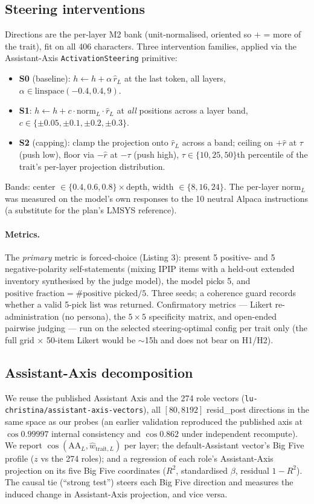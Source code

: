 \documentclass[11pt]{article}
\begin{document}
\subsection{Steering interventions}
Directions are the per-layer M2 bank (unit-normalised, oriented so $+$ = more of
the trait), fit on all 406 characters. Three intervention families, applied via
the Assistant-Axis \texttt{ActivationSteering} primitive:
\begin{itemize}
  \item \textbf{S0} (baseline): $h\!\leftarrow\!h+\alpha\,\hat r_L$ at the last
        token, all layers, $\alpha\in\text{linspace}(-0.4,0.4,9)$.
  \item \textbf{S1}: $h\!\leftarrow\!h+c\cdot\text{norm}_L\cdot\hat r_L$ at
        \emph{all} positions across a layer band, $c\in\{\pm0.05,\pm0.1,\pm0.2,\pm0.3\}$.
  \item \textbf{S2} (capping): clamp the projection onto $\hat r_L$ across a band;
        ceiling on $+\hat r$ at $\tau$ (push low), floor via $-\hat r$ at $-\tau$
        (push high), $\tau\in\{10,25,50\}$th percentile of the trait's
        per-layer projection distribution.
\end{itemize}
Bands: center $\in\{0.4,0.6,0.8\}\times$depth, width $\in\{8,16,24\}$. The
per-layer $\text{norm}_L$ was measured on the model's own responses to the 10
neutral Alpaca instructions (a substitute for the plan's LMSYS reference).

\paragraph{Metrics.} The \emph{primary} metric is forced-choice (Listing 3):
present 5 positive- and 5 negative-polarity self-statements (mixing IPIP items
with a held-out extended inventory synthesised by the judge model), the model
picks 5, and $\text{positive fraction}=\#\text{positive picked}/5$. Three seeds; a
coherence guard records whether a valid 5-pick list was returned. Confirmatory
metrics --- Likert re-administration (no persona), the $5\times5$ specificity
matrix, and open-ended pairwise judging --- run on the selected steering-optimal
config per trait only (the full grid $\times$ 50-item Likert would be $\sim$15h and
does not bear on H1/H2).

\subsection{Assistant-Axis decomposition}
\label{sec:aa}
We reuse the published Assistant Axis and the 274 role vectors
(\texttt{lu-christina/assistant-axis-vectors}), all $[80,8192]$ resid\_post
directions in the same space as our probes (an earlier validation reproduced the
published axis at $\cos 0.99997$ internal consistency and $\cos 0.862$ under
independent recompute). We report $\cos(\text{AA}_L,\hat w_{\text{trait},L})$ per
layer; the default-Assistant vector's Big Five profile ($z$ vs the 274 roles); and
a regression of each role's Assistant-Axis projection on its five Big Five
coordinates ($R^2$, standardised $\beta$, residual $1-R^2$). The causal tie
(``strong test'') steers each Big Five direction and measures the induced change
in Assistant-Axis projection, and vice versa.
\end{document}
